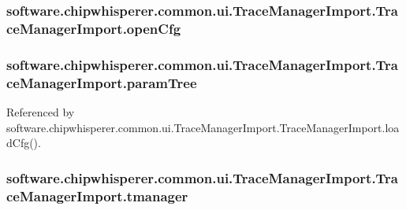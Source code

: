 \subsubsection[{open\+Cfg}]{\setlength{\rightskip}{0pt plus 5cm}software.\+chipwhisperer.\+common.\+ui.\+Trace\+Manager\+Import.\+Trace\+Manager\+Import.\+open\+Cfg}\label{classsoftware_1_1chipwhisperer_1_1common_1_1ui_1_1TraceManagerImport_1_1TraceManagerImport_a7e76137b976850a70682c0fcbba90421}
\hypertarget{classsoftware_1_1chipwhisperer_1_1common_1_1ui_1_1TraceManagerImport_1_1TraceManagerImport_a101c02d08da91a4978fc7abd5208bc9b}{}
\subsubsection[{param\+Tree}]{\setlength{\rightskip}{0pt plus 5cm}software.\+chipwhisperer.\+common.\+ui.\+Trace\+Manager\+Import.\+Trace\+Manager\+Import.\+param\+Tree}\label{classsoftware_1_1chipwhisperer_1_1common_1_1ui_1_1TraceManagerImport_1_1TraceManagerImport_a101c02d08da91a4978fc7abd5208bc9b}


Referenced by software.\+chipwhisperer.\+common.\+ui.\+Trace\+Manager\+Import.\+Trace\+Manager\+Import.\+load\+Cfg().

\hypertarget{classsoftware_1_1chipwhisperer_1_1common_1_1ui_1_1TraceManagerImport_1_1TraceManagerImport_a4aaf95a811103994cb4e13fadfd669f9}{}
\subsubsection[{tmanager}]{\setlength{\rightskip}{0pt plus 5cm}software.\+chipwhisperer.\+common.\+ui.\+Trace\+Manager\+Import.\+Trace\+Manager\+Import.\+tmanager}\label{classsoftware_1_1chipwhisperer_1_1common_1_1ui_1_1TraceManagerImport_1_1TraceManagerImport_a4aaf95a811103994cb4e13fadfd669f9}


